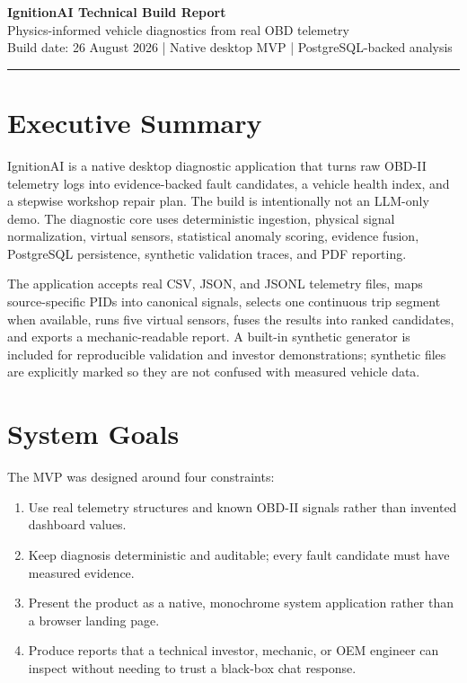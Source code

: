 \documentclass[11pt,a4paper]{article}
\begin{document}
\begin{center}
{\Huge \textbf{IgnitionAI Technical Build Report}}\\[0.35em]
{\large Physics-informed vehicle diagnostics from real OBD telemetry}\\[0.8em]
{\small Build date: 26 August 2026 \quad | \quad Native desktop MVP \quad | \quad PostgreSQL-backed analysis}
\end{center}

\vspace{0.8em}
\hrule
\vspace{1.0em}

\section*{Executive Summary}

IgnitionAI is a native desktop diagnostic application that turns raw OBD-II telemetry logs into evidence-backed fault candidates, a vehicle health index, and a stepwise workshop repair plan. The build is intentionally not an LLM-only demo. The diagnostic core uses deterministic ingestion, physical signal normalization, virtual sensors, statistical anomaly scoring, evidence fusion, PostgreSQL persistence, synthetic validation traces, and PDF reporting.

The application accepts real CSV, JSON, and JSONL telemetry files, maps source-specific PIDs into canonical signals, selects one continuous trip segment when available, runs five virtual sensors, fuses the results into ranked candidates, and exports a mechanic-readable report. A built-in synthetic generator is included for reproducible validation and investor demonstrations; synthetic files are explicitly marked so they are not confused with measured vehicle data.

\section{System Goals}

The MVP was designed around four constraints:

\begin{enumerate}
\item Use real telemetry structures and known OBD-II signals rather than invented dashboard values.
\item Keep diagnosis deterministic and auditable; every fault candidate must have measured evidence.
\item Present the product as a native, monochrome system application rather than a browser landing page.
\item Produce reports that a technical investor, mechanic, or OEM engineer can inspect without needing to trust a black-box chat response.
\end{enumerate}
\end{document}
